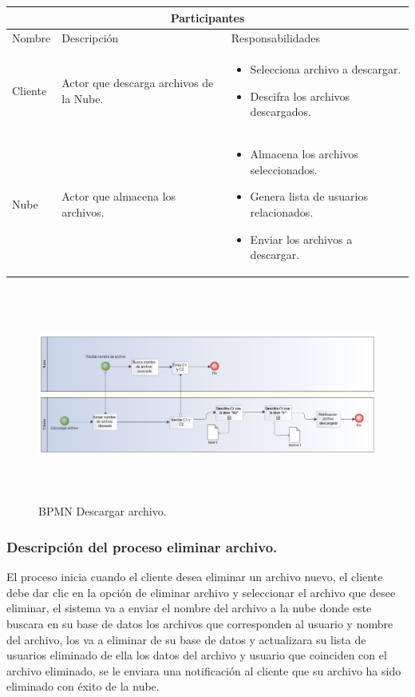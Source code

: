 \begin{tabular}{ |p{2cm}|p{6cm}|p{6cm}|  }
\hline
\multicolumn{3}{|c|}{  Participantes  } \\
\hline

{ Nombre }  & { Descripción } & { Responsabilidades} \\
\hline
{ Cliente } &   Actor que descarga archivos de la Nube.  &  
			\begin{itemize}	
				\item Selecciona archivo a descargar.
				\item Descifra los archivos descargados.
			\end{itemize}   \\ 
\hline
{ Nube } &   Actor que almacena los archivos.  &  
			\begin{itemize}	
				\item Almacena los archivos seleccionados.
				\item Genera lista de usuarios relacionados.
				\item Enviar los archivos a descargar.
			\end{itemize}   \\ 
\hline
\end{tabular}

\begin{figure}[H]
\centering
	\includegraphics[width=16cm, height=7cm]{./images/BPM_Descargar.png}
	\caption{BPMN Descargar archivo.}

\end{figure}

\vspace{3cm}
\subsubsection{Descripción del proceso eliminar archivo.}

El proceso inicia cuando el cliente desea eliminar un archivo nuevo, el cliente debe dar clic en la opción de eliminar archivo y seleccionar el archivo que desee eliminar, el sistema va a enviar el nombre del archivo a la nube donde este buscara en su base de datos los archivos que corresponden al usuario y nombre del archivo, los va a eliminar de su base de datos y actualizara su lista de usuarios eliminado de ella los datos del archivo y usuario que coinciden con el archivo eliminado, se le enviara una notificación al cliente que su archivo ha sido eliminado con éxito de la nube.\\



